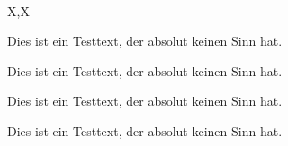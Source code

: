 \documentclass[a3paper,13pt,scifiposter,style=scifi]{tubsposter}
\begin{document}
~
\newpage
\begin{modulepage}{X,X}
  \begin{posterrow}[5cm,X]
    \begin{postercol}
      Dies ist ein Testtext, der absolut keinen Sinn hat.
    \end{postercol}
    \begin{postercol}
      Dies ist ein Testtext, der absolut keinen Sinn hat.
    \end{postercol}
  \end{posterrow}
  \begin{posterrow}[5cm,X]
    \begin{postercol}
      Dies ist ein Testtext, der absolut keinen Sinn hat.
    \end{postercol}
    \begin{postercol}
      Dies ist ein Testtext, der absolut keinen Sinn hat.
    \end{postercol}
  \end{posterrow}
\end{modulepage}
~
\newpage
\end{document}
